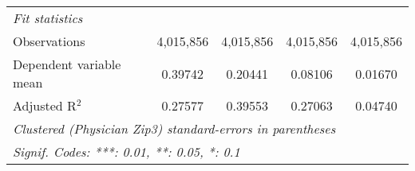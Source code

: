\begin{table}[htbp]
\begin{threeparttable}[b]
\begin{tabular}{lcccc}
         \emph{Fit statistics}\\
         Observations            & 4,015,856      & 4,015,856      & 4,015,856      & 4,015,856\\  
         Dependent variable mean & 0.39742        & 0.20441        & 0.08106        & 0.01670\\  
         Adjusted R$^2$          & 0.27577        & 0.39553        & 0.27063        & 0.04740\\  
         \midrule \midrule
         \multicolumn{5}{l}{\emph{Clustered (Physician Zip3) standard-errors in parentheses}}\\
         \multicolumn{5}{l}{\emph{Signif. Codes: ***: 0.01, **: 0.05, *: 0.1}}\\
      \end{tabular}
   \end{threeparttable}
\end{table}


